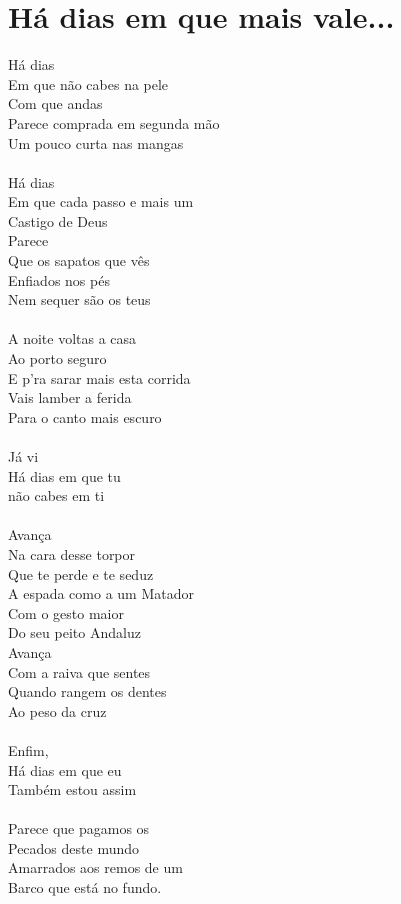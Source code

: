 \documentclass{article}
\begin{document}
\section{ Há dias em que mais vale...}
Há dias\\
Em que não cabes na pele\\
Com que andas\\
Parece comprada em segunda mão\\
Um pouco curta nas mangas\\
\\
Há dias\\
Em que cada passo e mais um\\
Castigo de Deus\\
Parece\\
Que os sapatos que vês\\
Enfiados nos pés\\
Nem sequer são os teus\\
\\
A noite voltas a casa\\
Ao porto seguro\\
E p'ra sarar mais esta corrida\\
Vais lamber a ferida\\
Para o canto mais escuro\\
\\
Já vi\\
Há dias em que tu\\
não cabes em ti\\
\\
Avança\\
Na cara desse torpor\\
Que te perde e te seduz\\
A espada como a um Matador\\
Com o gesto maior\\
Do seu peito Andaluz\\
Avança\\
Com a raiva que sentes\\
Quando rangem os dentes\\
Ao peso da cruz\\
\\
Enfim,\\
Há dias em que eu\\
Também estou assim\\
\\
Parece que pagamos os\\
Pecados deste mundo\\
Amarrados aos remos de um \\
Barco que está no fundo.\\
\end{document}
